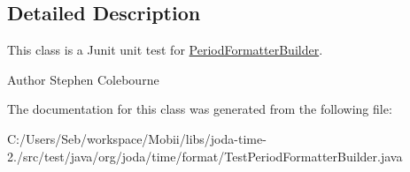\subsection{Detailed Description}
This class is a Junit unit test for \hyperlink{classorg_1_1joda_1_1time_1_1format_1_1_period_formatter_builder}{Period\-Formatter\-Builder}.

\begin{DoxyAuthor}{Author}
Stephen Colebourne 
\end{DoxyAuthor}


The documentation for this class was generated from the following file\-:\begin{DoxyCompactItemize}
\item 
C\-:/\-Users/\-Seb/workspace/\-Mobii/libs/joda-\/time-\/2./src/test/java/org/joda/time/format/Test\-Period\-Formatter\-Builder.\-java\end{DoxyCompactItemize}
